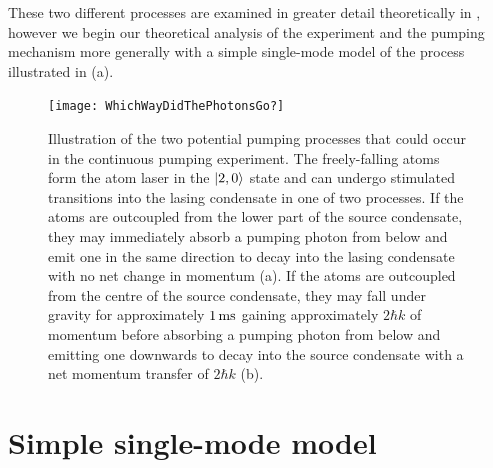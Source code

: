 These two different processes are examined in greater detail theoretically in , however we begin our theoretical analysis of the experiment and the pumping mechanism more generally with a simple single-mode model of the process illustrated in (a).

\begin{figure}
    \centering
    \texttt{[image: WhichWayDidThePhotonsGo?]}
    \caption{Illustration of the two potential pumping processes that could occur in the continuous pumping experiment.  The freely-falling atoms form the atom laser in the ${\left|2, 0\right>}$ state and can undergo stimulated transitions into the lasing condensate in one of two processes.  If the atoms are outcoupled from the lower part of the source condensate, they may immediately absorb a pumping photon from below and emit one in the same direction to decay into the lasing condensate with no net change in momentum (a).  If the atoms are outcoupled from the centre of the source condensate, they may fall under gravity for approximately $\unit[1]{ms}$ gaining approximately $2 \hbar k$ of momentum before absorbing a pumping photon from below and emitting one downwards to decay into the source condensate with a net momentum transfer of $2 \hbar k$ (b).}
    \label{OpticalPumping:WhichWayDidThePhotonsGo?}
\end{figure}


\section{Simple single-mode model}
\label{OpticalPumping:SingleModeModel}

